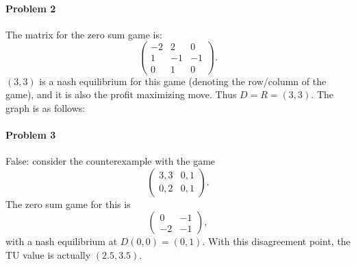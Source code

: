 \documentclass[12pt]{article}
\begin{document}
\paragraph{Problem 2}
The matrix for the zero sum game is:
\begin{displaymath}
  \begin{pmatrix}
    -2 & 2 & 0\\
    1 & -1 & -1\\
    0 & 1 & 0
  \end{pmatrix}.
\end{displaymath}
$(3,3)$ is a nash equilibrium for this game (denoting the row/column of the game),
and it is also the profit maximizing move. Thus $D = R = (3,3)$. The graph is
as follows:

\paragraph{Problem 3}
False: consider the counterexample with the game
\begin{displaymath}
  \begin{pmatrix}
    3,3 & 0,1\\
    0,2 & 0,1
  \end{pmatrix}.
\end{displaymath}
The zero sum game for this is
\begin{displaymath}
  \begin{pmatrix}
    0 & -1\\
    -2& -1
  \end{pmatrix},
\end{displaymath}
with a nash equilibrium at $D(0,0) = (0,1)$. With this disagreement point,
the TU value is actually $(2.5,3.5)$.
\end{document}
